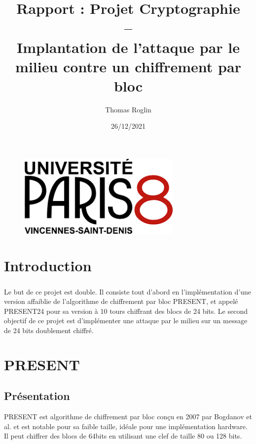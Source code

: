 \documentclass{report}
\begin{document}
\begin{figure}
    \centering
    \includegraphics[width=8cm]{ressources/p8.png}
    \title{Rapport : Projet Cryptographie \\ -- \\ Implantation de l’attaque par le milieu contre un chiffrement
    par bloc }
    \author{Thomas Roglin \\  }
    \date{26/12/2021}
    
    
\end{figure}


\maketitle

\newpage

\tableofcontents

\chapter{Introduction}
\paragraph{} 
Le but de ce projet est double. Il consiste tout d'abord en l'implémentation d'une version affaiblie de l'algorithme de chiffrement par bloc PRESENT, 
et appelé PRESENT24 pour sa version à 10 tours chiffrant des blocs de 24 bits.
Le second objectif de ce projet est d'implémenter une attaque par le milieu sur un message de 24 bits doublement chiffré.

\chapter{PRESENT}  
\section{ Présentation } 
PRESENT est algorithme de chiffrement par bloc conçu en 2007 par Bogdanov et al. et est notable pour sa faible taille, idéale pour une implémentation hardware. 
Il peut chiffrer des blocs de 64bits en utilisant une clef de taille 80 ou 128 bits.
\end{document}

